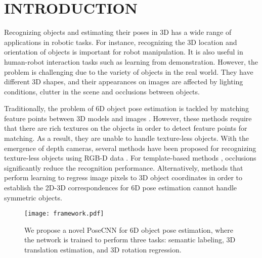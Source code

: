 \documentclass[conference]{IEEEtran}
\begin{document}
\section{INTRODUCTION}

Recognizing objects and estimating their poses in 3D has a wide range of applications in robotic tasks. For instance, recognizing the 3D location and orientation of objects is important for robot manipulation. It is also useful in human-robot interaction tasks such as learning from demonstration. However, the problem is challenging due to the variety of objects in the real world. They have different 3D shapes, and their appearances on images are affected by lighting conditions, clutter in the scene and occlusions between objects.

Traditionally, the problem of 6D object pose estimation is tackled by matching feature points between 3D models and images \cite{lowe1999object,rothganger20063d,collet2011moped}. However, these methods require that there are rich textures on the objects in order to detect feature points for matching. As a result, they are unable to handle texture-less objects. With the emergence of depth cameras, several methods have been proposed for recognizing texture-less objects using RGB-D data \cite{hinterstoisser2012model,brachmann2014learning,Bo14Lea,schwarz2015rgb,kehl2016deep}. For template-based methods \cite{hinterstoisser2012model,hinterstoisser2012gradient}, occlusions significantly reduce the recognition performance. Alternatively, methods that perform learning to regress image pixels to 3D object coordinates in order to establish the 2D-3D correspondences for 6D pose estimation \cite{brachmann2014learning,brachmann2016uncertainty} cannot handle symmetric objects.

\begin{figure}
	\centering
	\texttt{[image: framework.pdf]}
	\caption{We propose a novel PoseCNN for 6D object pose estimation, where the network is trained to perform three tasks: semantic labeling, 3D translation estimation, and 3D rotation regression.}
	\label{fig:framework}
	\vspace{-8mm}
\end{figure}
\end{document}
